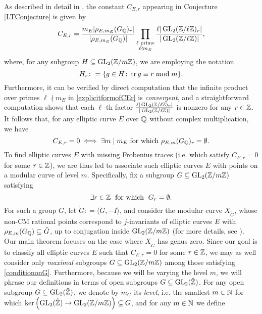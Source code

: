 As described in detail in \cite{langtrotter}, the constant $C_{E,r}$ appearing in Conjecture \ref{LTConjecture} is given by
\begin{equation} \label{explicitformofCEr}
C_{E,r} = \frac{m_E | \rho_{E,m_E}(G_\mbq)_r |}{| \rho_{E,m_E}(G_\mbq) |} \prod_{{\begin{substack} {\ell \text{ prime} \\ \ell \nmid m_E} \end{substack}}} \frac{\ell | \GL_2(\mbz/\ell\mbz)_r  |}{| \GL_2(\mbz/\ell\mbz) |},
\end{equation}
where, for any subgroup $H \subseteq \operatorname{GL}_2(\mathbb{Z}/m\mathbb{Z})$, we are employing the notation
\[
H_r \colon= \{ g \in H \colon \operatorname{tr} g \equiv r \bmod m \}.
\]
Furthermore, it can be verified by direct computation that the infinite product over primes $\ell \nmid m_E$ in \eqref{explicitformofCEr} is \emph{convergent}, and a straightforward computation shows that each $\ell$-th factor $ \frac{\ell | \operatorname{GL}_2(\mathbb{Z}/\ell\mathbb{Z})_r  |}{| \operatorname{GL}_2(\mathbb{Z}/\ell\mathbb{Z}) |}$ is nonzero for any $r \in \mathbb{Z}$.  It follows that, for any elliptic curve $E$ over $\mathbb{Q}$ without complex multiplication, we have
\[
C_{E,r} = 0 \; \Longleftrightarrow \; \exists m \mid m_E \text{ for which } \rho_{E,m}(G_{\mathbb{Q}})_r = \emptyset.
\]
To find elliptic curves $E$ with missing Frobenius traces (i.e. which satisfy $C_{E,r} = 0$ for some $r \in \mathbb{Z}$), we are thus led to associate such elliptic curves $E$ with points on a modular curve of level $m$.  Specifically, fix a subgroup $G \subseteq \operatorname{GL}_2(\mathbb{Z}/m\mathbb{Z})$ satisfying 
\begin{equation} \label{conditiononG}
\exists r \in\mathbb{Z} \; \text{ for which } \; G_r = \emptyset.
\end{equation}
For such a group $G$, let $\tilde{G} \colon= \langle G, -I \rangle$, and consider the modular curve $X_{\tilde{G}}$, whose non-CM rational points correspond to $j$-invariants of elliptic curves $E$ with $\rho_{E,m}(G_{\mathbb{Q}}) \subseteq \tilde{G}$, up to conjugation inside $\operatorname{GL}_2(\mathbb{Z}/m\mathbb{Z})$ (for more details, see \cite{delignerapoport}).  Our main theorem 
focuses on the case where $X_{\tilde{G}}$ has genus zero.  Since our goal is to classify all elliptic curves $E$ such that $C_{E,r} = 0$ for some $r \in \mathbb{Z}$, we may as well consider only \emph{maximal} subgroups $G \subseteq \operatorname{GL}_2(\mathbb{Z}/m\mathbb{Z})$ among those satisfying \eqref{conditiononG}.  Furthermore, because we will be varying the level $m$, we will phrase our definitions in terms of open subgroups $G \subseteq \operatorname{GL}_2(\hat{\mathbb{Z}})$.
For any open subgroup $G \subseteq \operatorname{GL}_2(\hat{\mathbb{Z}})$, we denote by $m_G$ its \emph{level}, i.e. the smallest $m \in \mathbb{N}$ for which $\ker\left(\operatorname{GL}_2(\hat{\mathbb{Z}}) \rightarrow \operatorname{GL}_2(\mathbb{Z}/m\mathbb{Z}) \right) \subseteq G$, and for any $m \in \mathbb{N}$ we define 
